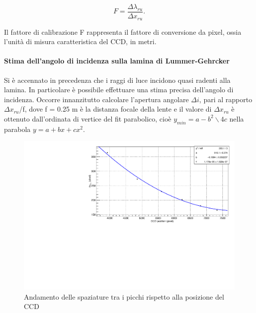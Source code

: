 \documentclass{article}
\begin{document}
	\begin{equation}
		F = \frac{\Delta\lambda_{ru}}{\Delta x_{ru}}.
	\end{equation}

	Il fattore di calibrazione F rappresenta il fattore di conversione da pixel, 
	ossia l'unità di misura caratteristica del CCD, in metri.




	\paragraph{Stima dell'angolo di incidenza sulla lamina di Lummer-Gehrcker}
	Si è accennato in precedenza che i raggi di luce incidono quasi radenti
	alla lamina. In particolare è possibile effettuare una stima precisa dell'angolo
	di incidenza. Occorre innanzitutto calcolare l'apertura angolare
	$\Delta i$, pari al rapporto $\Delta x_{ru}$/f, dove f = 0.25 m è la distanza
	focale della lente e il valore di $\Delta x_{ru}$ è ottenuto dall'ordinata 
	di vertice del fit parabolico, cioè $y_{min} = a - b^2\backslash 4c$ nella 
	parabola $y = a +bx + cx^2$.


	\begin{center}
		\begin{figure}[H]
			\centering
			\includegraphics[scale=0.38, angle=0]{campospento/deltaxruBoff.pdf}
			\caption{Andamento delle spaziature tra i picchi rispetto alla posizione del CCD}
			\label{fig:deltaxruBoff}
		\end{figure}
	\end{center}
\end{document}
